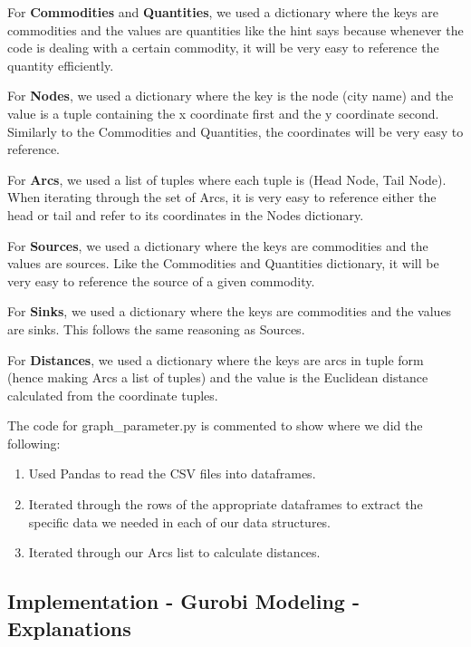 \documentclass[
]{article}
\providecommand{\tightlist}{%
  \setlength{\itemsep}{0pt}\setlength{\parskip}{0pt}}
\begin{document}
For \textbf{Commodities} and \textbf{Quantities}, we used a dictionary
where the keys are commodities and the values are quantities like the
hint says because whenever the code is dealing with a certain commodity,
it will be very easy to reference the quantity efficiently.

For \textbf{Nodes}, we used a dictionary where the key is the node (city
name) and the value is a tuple containing the x coordinate first and the
y coordinate second. Similarly to the Commodities and Quantities, the
coordinates will be very easy to reference.

For \textbf{Arcs}, we used a list of tuples where each tuple is (Head
Node, Tail Node). When iterating through the set of Arcs, it is very
easy to reference either the head or tail and refer to its coordinates
in the Nodes dictionary.

For \textbf{Sources}, we used a dictionary where the keys are
commodities and the values are sources. Like the Commodities and
Quantities dictionary, it will be very easy to reference the source of a
given commodity.

For \textbf{Sinks}, we used a dictionary where the keys are commodities
and the values are sinks. This follows the same reasoning as Sources.

For \textbf{Distances}, we used a dictionary where the keys are arcs in
tuple form (hence making Arcs a list of tuples) and the value is the
Euclidean distance calculated from the coordinate tuples.

The code for graph\_parameter.py is commented to show where we did the
following:

\begin{enumerate}
\def\labelenumi{\arabic{enumi}.}
\tightlist
\item
  Used Pandas to read the CSV files into dataframes.
\item
  Iterated through the rows of the appropriate dataframes to extract the
  specific data we needed in each of our data structures.
\item
  Iterated through our Arcs list to calculate distances.
\end{enumerate}

\hypertarget{implementation---gurobi-modeling---explanations}{%
\subsection{Implementation - Gurobi Modeling -
Explanations}\label{implementation---gurobi-modeling---explanations}}
\end{document}
